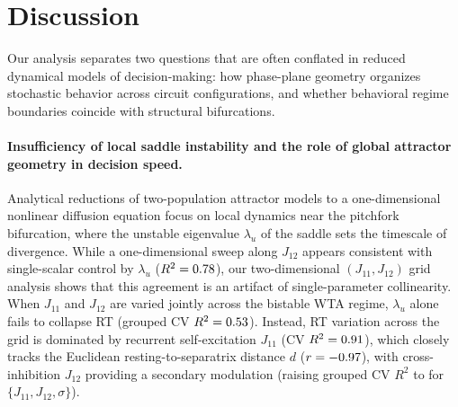 \documentclass[11pt]{article}
\begin{document}
	\section{Discussion}
	Our analysis separates two questions that are often conflated in reduced dynamical models of decision-making: how phase-plane geometry organizes stochastic behavior across circuit configurations, and whether behavioral regime boundaries coincide with structural bifurcations.
	
	\paragraph{Insufficiency of local saddle instability and the role of global attractor geometry in decision speed.}
	Analytical reductions of two-population attractor models to a one-dimensional nonlinear diffusion equation \citep{RoxinLedberg2008} focus on local dynamics near the pitchfork bifurcation, where the unstable eigenvalue $\lambda_u$ of the saddle sets the timescale of divergence. While a one-dimensional sweep along $J_{12}$ appears consistent with single-scalar control by $\lambda_u$ ($R^2=0.78$), our two-dimensional $(J_{11},J_{12})$ grid analysis shows that this agreement is an artifact of single-parameter collinearity. When $J_{11}$ and $J_{12}$ are varied jointly across the bistable WTA regime, $\lambda_u$ alone fails to collapse RT (grouped CV $R^2=0.53$). Instead, RT variation across the grid is dominated by recurrent self-excitation $J_{11}$ (CV $R^2=0.91$), which closely tracks the Euclidean resting-to-separatrix distance $d$ ($r=-0.97$), with cross-inhibition $J_{12}$ providing a secondary modulation (raising grouped CV $R^2$ to \ddRTJJCV{} for $\{J_{11},J_{12},\sigma\}$).
	
\end{document}
